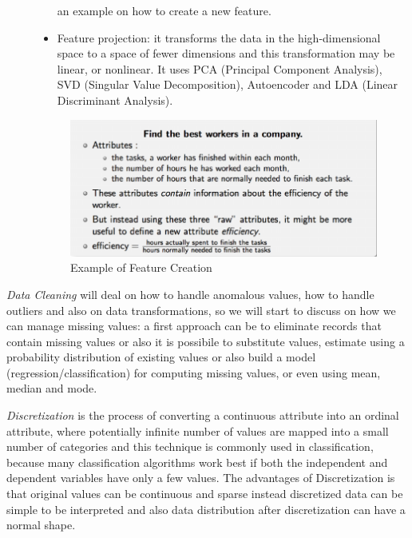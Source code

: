 \begin{description}
\begin{itemize}
                                         an example on how to create a new feature.
                                   \item Feature projection: it transforms the data in the high-dimensional space
                                         to a space of fewer dimensions and this transformation may be linear,
                                         or nonlinear.\newline
					 It uses PCA (Principal Component Analysis), SVD (Singular Value Decomposition),
					 Autoencoder and LDA (Linear Discriminant Analysis).
                               \end{itemize}

                               \begin{figure}
                                    \caption{Example of Feature Creation}
                                    \label{img:featureCreation}
                                    \includegraphics[width=\textwidth]{Images/featureCreation}
                               \end{figure}
\end{description}
\emph{Data Cleaning} will deal on how to handle anomalous values, how to handle outliers and also on data transformations, so we will
start to discuss on how we can manage missing values: a first approach can be to eliminate records that contain missing values or also it 
is possibile to substitute values, estimate using a probability distribution of existing values or also build a model (regression/classification) 
for computing missing values, or even using mean, median and mode.

\emph{Discretization} is the process of converting a continuous attribute into an ordinal attribute, where potentially infinite number of values
are mapped into a small number of categories and this technique is commonly used in classification, because many classification algorithms 
work best if both the independent and dependent variables have only a few values.\newline
The advantages of Discretization is that original values can be continuous and sparse instead discretized data can be simple to be interpreted 
and also data distribution after discretization can have a normal shape.

